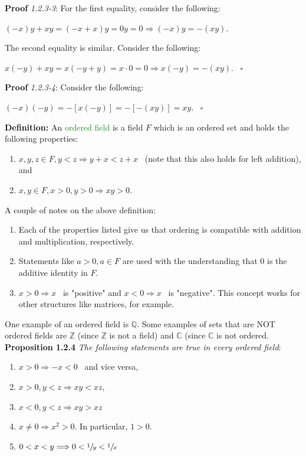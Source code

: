 \documentclass{article}
\begin{document}
\textbf{Proof} \textit{1.2.3-3}: For the first equality, consider the following:
\begin{center}
    $(-x)y+xy=(-x+x)y=0y=0 \Longrightarrow (-x)y=-(xy)$.
\end{center}

The second equality is similar. Consider the following:
\begin{center}
    $x(-y)+xy=x(-y+y)=x \cdot 0 = 0 \Longrightarrow x(-y)=-(xy)$. \ $\square$
\end{center}

\textbf{Proof} \textit{1.2.3-4}: Consider the following:
\begin{center}
    $(-x)(-y)=-[x(-y)]=-[-(xy)]=xy$. \ $\square$
\end{center}

\textbf{Definition:} An \textcolor{ForestGreen}{ordered field} is a field $F$ which is an ordered set and holds the following properties:
\begin{enumerate}
    \item $x,y,z \in F, y < z \Longrightarrow y+x<z+x$ \ (note that this also holds for left addition), and 
    \item $x,y \in F, x>0, y>0 \Longrightarrow xy>0$. 
\end{enumerate}

A couple of notes on the above definition:
\begin{enumerate}
    \item Each of the properties listed give us that ordering is compatible with addition and multiplication, respectively.
    \item Statements like $a>0, a \in F$ are used with the understanding that $0$ is the additive identity in $F$.
    \item $x>0 \Longrightarrow x$ \ is "positive" and $x<0 \Longrightarrow x$ \ is "negative". This concept works for other structures like matrices, for example.
\end{enumerate}

One example of an ordered field is $\mathbb{Q}$. Some examples of sets that are NOT ordered fields are $\mathbb{Z}$ (since $\mathbb{Z}$ is not a field) and $\mathbb{C}$ (since $\mathbb{C}$ is not ordered.\\

\textbf{Proposition 1.2.4} \textit{The following statements are true in every ordered field}:
\begin{enumerate}
    \item $x>0 \Longrightarrow -x<0$ \ and vice versa,
    \item $x > 0, y < z \Longrightarrow xy<xz$,
    \item $x<0,y<z \Longrightarrow xy>xz$
    \item $x \neq 0 \Longrightarrow x^2>0$. In particular, $1>0$.
    \item $0<x<y \Longrightarrow 0<\sfrac{1}{y} < \sfrac{1}{x}$
\end{enumerate}
\end{document}
